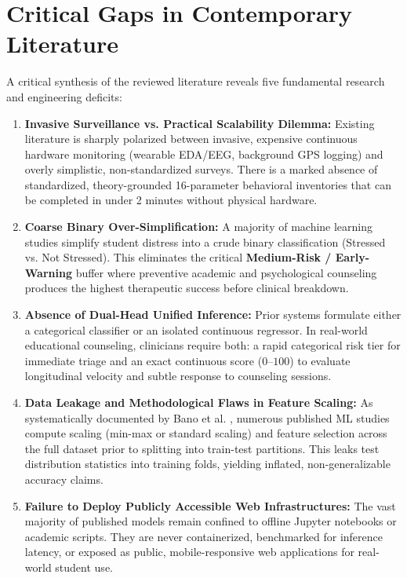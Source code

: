 \documentclass[12pt,a4paper,oneside]{report}
\begin{document}
\section{Critical Gaps in Contemporary Literature}
\label{sec:research_gaps}
A critical synthesis of the reviewed literature reveals five fundamental research and engineering deficits:
\begin{enumerate}
    \item \textbf{Invasive Surveillance vs. Practical Scalability Dilemma:} Existing literature is sharply polarized between invasive, expensive continuous hardware monitoring (wearable EDA/EEG, background GPS logging) and overly simplistic, non-standardized surveys. There is a marked absence of standardized, theory-grounded 16-parameter behavioral inventories that can be completed in under 2 minutes without physical hardware.
    \item \textbf{Coarse Binary Over-Simplification:} A majority of machine learning studies simplify student distress into a crude binary classification (Stressed vs. Not Stressed). This eliminates the critical \textbf{Medium-Risk / Early-Warning} buffer where preventive academic and psychological counseling produces the highest therapeutic success before clinical breakdown.
    \item \textbf{Absence of Dual-Head Unified Inference:} Prior systems formulate either a categorical classifier or an isolated continuous regressor. In real-world educational counseling, clinicians require both: a rapid categorical risk tier for immediate triage and an exact continuous score ($0$--$100$) to evaluate longitudinal velocity and subtle response to counseling sessions.
    \item \textbf{Data Leakage and Methodological Flaws in Feature Scaling:} As systematically documented by Bano et al. \cite{bano2022}, numerous published ML studies compute scaling (min-max or standard scaling) and feature selection across the full dataset prior to splitting into train-test partitions. This leaks test distribution statistics into training folds, yielding inflated, non-generalizable accuracy claims.
    \item \textbf{Failure to Deploy Publicly Accessible Web Infrastructures:} The vast majority of published models remain confined to offline Jupyter notebooks or academic scripts. They are never containerized, benchmarked for inference latency, or exposed as public, mobile-responsive web applications for real-world student use.
\end{enumerate}
\end{document}
